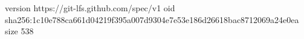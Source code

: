 version https://git-lfs.github.com/spec/v1
oid sha256:1c10e788ca661d04219f395a007d9304e7e53e186d26618bac8712069a24e0ea
size 538
